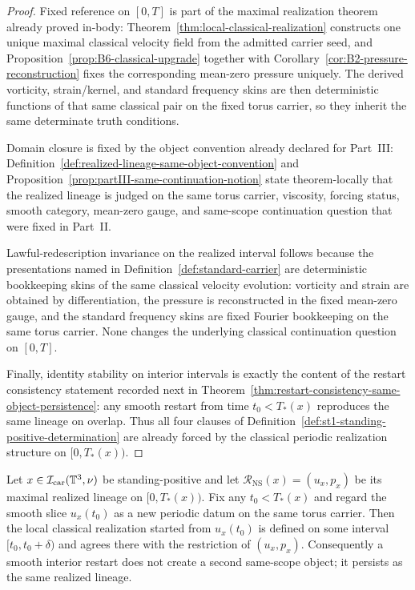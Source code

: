 \begin{proof}
Fixed reference on $[0,T]$ is part of the maximal realization theorem already proved in-body: Theorem~\ref{thm:local-classical-realization} constructs one unique maximal classical velocity field from the admitted carrier seed, and Proposition~\ref{prop:B6-classical-upgrade} together with Corollary~\ref{cor:B2-pressure-reconstruction} fixes the corresponding mean-zero pressure uniquely. The derived vorticity, strain/kernel, and standard frequency skins are then deterministic functions of that same classical pair on the fixed torus carrier, so they inherit the same determinate truth conditions.

Domain closure is fixed by the object convention already declared for Part~III: Definition~\ref{def:realized-lineage-same-object-convention} and Proposition~\ref{prop:partIII-same-continuation-notion} state theorem-locally that the realized lineage is judged on the same torus carrier, viscosity, forcing status, smooth category, mean-zero gauge, and same-scope continuation question that were fixed in Part~II.

Lawful-redescription invariance on the realized interval follows because the presentations named in Definition~\ref{def:standard-carrier} are deterministic bookkeeping skins of the same classical velocity evolution: vorticity and strain are obtained by differentiation, the pressure is reconstructed in the fixed mean-zero gauge, and the standard frequency skins are fixed Fourier bookkeeping on the same torus carrier. None changes the underlying classical continuation question on $[0,T]$.

Finally, identity stability on interior intervals is exactly the content of the restart consistency statement recorded next in Theorem~\ref{thm:restart-consistency-same-object-persistence}: any smooth restart from time $t_0<T_*(x)$ reproduces the same lineage on overlap. Thus all four clauses of Definition~\ref{def:st1-standing-positive-determination} are already forced by the classical periodic realization structure on $[0,T_*(x))$.
\end{proof}

\begin{manualtheorem}
\label{thm:restart-consistency-same-object-persistence}
Let $x\in\mathcal I_{\mathrm{car}}(\mathbb{T}^3,\nu)$ be standing-positive and let $\mathcal R_{\mathrm{NS}}(x)=(u_x,p_x)$ be its maximal realized lineage on $[0,T_*(x))$. Fix any $t_0<T_*(x)$ and regard the smooth slice $u_x(t_0)$ as a new periodic datum on the same torus carrier. Then the local classical realization started from $u_x(t_0)$ is defined on some interval $[t_0,t_0+\delta)$ and agrees there with the restriction of $(u_x,p_x)$. Consequently a smooth interior restart does not create a second same-scope object; it persists as the same realized lineage.
\end{manualtheorem}

